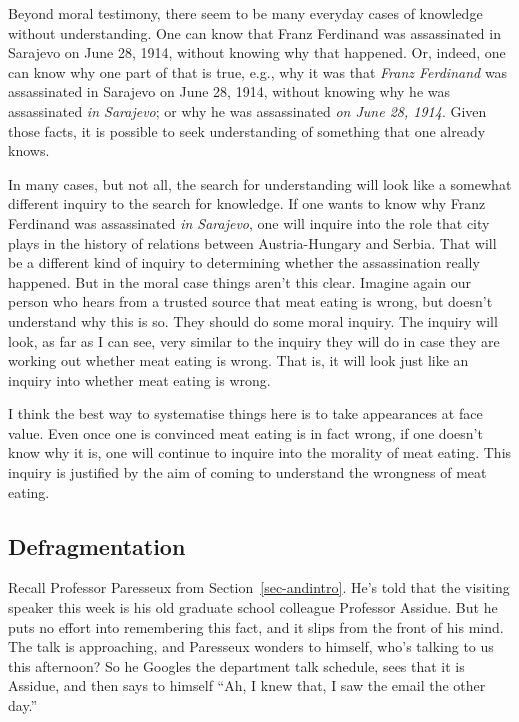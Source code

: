 \documentclass[
  10pt,
  letterpaper,
  twoside]{scrbook}
\begin{document}
Beyond moral testimony, there seem to be many everyday cases of
knowledge without understanding. One can know that Franz Ferdinand was
assassinated in Sarajevo on June 28, 1914, without knowing why that
happened. Or, indeed, one can know why one part of that is true, e.g.,
why it was that \emph{Franz Ferdinand} was assassinated in Sarajevo on
June 28, 1914, without knowing why he was assassinated \emph{in
Sarajevo}; or why he was assassinated \emph{on June 28, 1914}. Given
those facts, it is possible to seek understanding of something that one
already knows.

In many cases, but not all, the search for understanding will look like
a somewhat different inquiry to the search for knowledge. If one wants
to know why Franz Ferdinand was assassinated \emph{in Sarajevo}, one
will inquire into the role that city plays in the history of relations
between Austria-Hungary and Serbia. That will be a different kind of
inquiry to determining whether the assassination really happened. But in
the moral case things aren't this clear. Imagine again our person who
hears from a trusted source that meat eating is wrong, but doesn't
understand why this is so. They should do some moral inquiry. The
inquiry will look, as far as I can see, very similar to the inquiry they
will do in case they are working out whether meat eating is wrong. That
is, it will look just like an inquiry into whether meat eating is wrong.

I think the best way to systematise things here is to take appearances
at face value. Even once one is convinced meat eating is in fact wrong,
if one doesn't know why it is, one will continue to inquire into the
morality of meat eating. This inquiry is justified by the aim of coming
to understand the wrongness of meat eating.

\subsection{Defragmentation}\label{sec-defraginquiry}

Recall Professor Paresseux from Section~\ref{sec-andintro}. He's told
that the visiting speaker this week is his old graduate school colleague
Professor Assidue. But he puts no effort into remembering this fact, and
it slips from the front of his mind. The talk is approaching, and
Paresseux wonders to himself, who's talking to us this afternoon? So he
Googles the department talk schedule, sees that it is Assidue, and then
says to himself ``Ah, I knew that, I saw the email the other day.''
\end{document}
